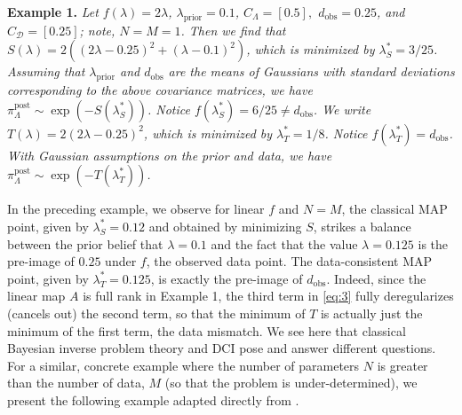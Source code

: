 \documentclass{amsart}
\begin{document}
\vspace{.125cm} 

\noindent \textbf{Example 1.} \textit{Let $f(\lambda)=2\lambda$, $\lambda_\text{prior}=0.1$, $C_\Lambda=[0.5],$ $d_\text{obs}=0.25$, and $C_\mathcal{D}=[0.25]$; note, $N=M=1$. Then we find that $S(\lambda)=2((2\lambda-0.25)^2+(\lambda-0.1)^2)$, which is minimized by $\lambda^*_S=3/25$. Assuming that $\lambda_\text{prior}$ and $d_\text{obs}$ are the means of Gaussians with standard deviations corresponding to the above covariance matrices, we have $\pi_\Lambda^\text{post} \sim \exp(-S(\lambda_S^*))$. Notice $f(\lambda^*_S)=6/25\neq d_\text{obs}$. We write $T(\lambda)=2(2\lambda-0.25)^2$, which is minimized by $\lambda^*_T=1/8$. Notice $f(\lambda^*_T)=d_\text{obs}$. With Gaussian assumptions on the prior and data, we have $\pi_\Lambda^\text{post} \sim \exp(-T(\lambda_T^*))$.}



\vspace{.125cm}

In the preceding example, we observe for linear $f$ and $N=M$, the classical MAP point, given by $\lambda_S^*=0.12$ and obtained by minimizing $S$, strikes a balance between the prior belief that $\lambda=0.1$ and the fact that the value $\lambda=0.125$ is the pre-image of $0.25$ under $f$, the observed data point. The data-consistent MAP point, given by $\lambda_T^*=0.125$, is exactly the pre-image of $d_\text{obs}$. Indeed, since the linear map $A$ is full rank in Example 1, the third term in \eqref{eq:3} fully deregularizes (cancels out) the second term, so that the minimum of $T$ is actually just the minimum of the first term, the data mismatch. We see here that classical Bayesian inverse problem theory and DCI pose and answer different questions. For a similar, concrete example where the number of parameters $N$ is greater than the number of data, $M$ (so that the problem is under-determined), we present the following example adapted directly from \cite{BJW18a}.


\vspace{.125cm} 
\end{document}
